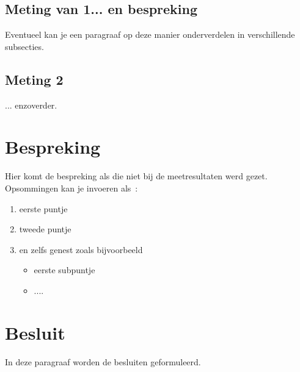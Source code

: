\documentclass[10pt,a4paper,twoside]{article}
\begin{document}
\subsection{Meting van 1... en bespreking}
Eventueel kan je een paragraaf op deze manier onderverdelen in verschillende subsecties.





\subsection{Meting 2}
... enzoverder.

\section{Bespreking}
Hier komt de bespreking als die niet bij de meetresultaten werd gezet. 
Opsommingen kan je invoeren als~:
\begin{enumerate}
\item 
eerste puntje
\item
tweede puntje
\item
en zelfs genest zoals bijvoorbeeld
\begin{itemize}
\item eerste subpuntje
\item ....
\end{itemize}
\end{enumerate}

\section{Besluit}
In deze paragraaf worden de besluiten geformuleerd.
\end{document}
